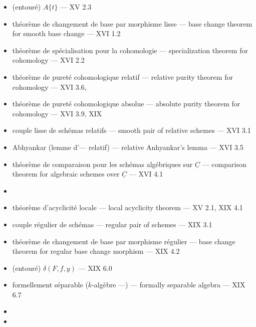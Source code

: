 \documentclass[11pt,a4paper]{article}
\begin{document}
\begin{itemize}
locally 1-aspheric morphism --- XV 1.11
\item (entouré) $A\{t\}$ --- XV 2.3
\item théorème de changement de base par morphisme lisse --- base change theorem
for smooth base change --- XVI 1.2
\item théorème de spécialisation pour la cohomologie --- specialization theorem
for cohomology --- XVI 2.2
\item théorème de pureté cohomologique relatif --- relative purity theorem for
cohomology --- XVI 3.6, 
\item théorème de pureté cohomologique absolue --- absolute purity theorem for
cohomology --- XVI 3.9, XIX 
\item couple lisse de schémas relatifs --- smooth pair of relative schemes ---
XVI 3.1
\item Abhyankar (lemme d'--- relatif) --- relative Anhyankar's lemma --- XVI 3.5
\item théorème de comparaison pour les schémas algébriques sur $\underline{C}$
--- comparison theorem for algebraic schemes over $\underline{C}$ --- XVI 4.1
\end{itemize}


\begin{itemize}
\item {}
\item théorème d'acyclicité locale --- local acyclicity theorem --- XV 2.1, XIX
4.1
\item couple régulier de schémas --- regular pair of schemes --- XIX 3.1
\item théorème de changement de base par morphisme régulier --- base change
theorem for regular base change morphism --- XIX 4.2
\item (entouré) $\delta(F,f,y)$ --- XIX 6.0
\item formellement séparable ($k$-algèbre ---) --- formally separable algebra
--- XIX 6.7
\item {}
\item {}
\end{itemize}

\end{document}
